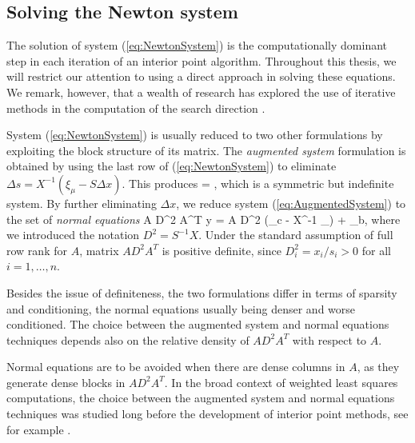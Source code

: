 %
%
\subsection{Solving the Newton system}
\label{sec:SolvingNewtonSystem}

The solution of system (\ref{eq:NewtonSystem}) is the computationally
dominant step in each iteration of an interior point algorithm.
Throughout this thesis, we will 
restrict our attention to using a direct approach in solving these
equations.
We remark, however, that a wealth of research has explored the use
of iterative methods in the computation of the search direction
\cite{BergamaschiGondzioZilli,OliveiraSorensen05}.

System (\ref{eq:NewtonSystem}) is usually reduced to two other
formulations by exploiting the block structure of its
matrix.
%
The {\em augmented system} formulation is obtained by using 
the last row of (\ref{eq:NewtonSystem}) to eliminate
$\Delta s = X^{-1} (\xi_\mu - S\Delta x)$.
This produces
%
\be \label{eq:AugmentedSystem}
\left[ \begin{array}{cc}
    -X^{-1}S & A^T \\ A & 0
  \end{array} \right]
 =
\left[ \begin{array}{c}
    \xi_c - X^{-1}\xi_\mu \\ \xi_b
   \end{array} \right],
\ee
which is a symmetric but indefinite system.
%
By further eliminating $\Delta x$, we reduce system 
(\ref{eq:AugmentedSystem}) to the set of {\em normal equations}
%
\be \label{eq:NormalEquations}
  A D^2 A^T \Delta y = A D^2 (\xi_c - X^{-1} \xi_\mu) + \xi_b,
\ee
%
where we introduced the notation $D^2 = S^{-1} X$.
Under the standard assumption of full row rank for $A$, matrix 
$A D^2 A^T$ is positive definite, since $D^2_i = x_i/s_i > 0$ for
all $i = 1, \ldots, n$.

Besides the issue of definiteness, the two formulations differ in
terms of sparsity and conditioning, the normal equations usually 
being denser and worse conditioned.
The choice between the augmented system and normal equations
techniques depends also on 
the relative density of $AD^2A^T$ with respect to $A$.

Normal equations are to be avoided when there are dense columns in $A$, 
as they generate dense blocks in $AD^2A^T$.
In the broad context of weighted least squares computations, the choice
between the augmented system and normal equations techniques was studied long
before the development of interior point methods, see for example
\cite{DuffErismanReid86}.

